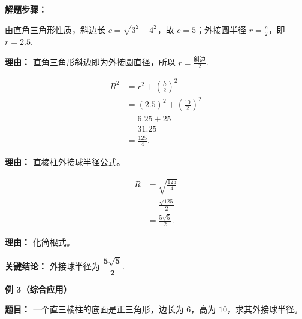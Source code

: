 \begin{examplebox}
	\textbf{\textcolor{CExample}{解题步骤：}}
	\begin{description}[style=nextline, leftmargin=2.8em, labelsep=0.5em, itemsep=0.45em]
		\item[\textbf{第一步（求底面外接圆半径）：}] 由直角三角形性质，斜边长 $c = \sqrt{3^2+4^2}$，故 $c=5$；外接圆半径 $r = \frac{c}{2}$，即 $r = 2.5$.
			\par\textbf{理由：} 直角三角形斜边即为外接圆直径，所以 $r = \frac{\text{斜边}}{2}$.
		\item[\textbf{第二步（套用公式）：}]
			\[
				\begin{aligned}
					R^2 &= r^2 + \left(\frac{h}{2}\right)^2 \\
					&= (2.5)^2 + \left(\frac{10}{2}\right)^2 \\
					&= 6.25 + 25 \\
					&= 31.25 \\
					&= \frac{125}{4}.
			\end{aligned}
			\]
			\par\textbf{理由：} 直棱柱外接球半径公式。
		\item[\textbf{第三步（求半径）：}]
			\[
				\begin{aligned}
					R &= \sqrt{\frac{125}{4}} \\
					&= \frac{\sqrt{125}}{2} \\
					&= \frac{5\sqrt{5}}{2}.
			\end{aligned}
			\]
			\par\textbf{理由：} 化简根式。
	\end{description}

	\textbf{\textcolor{CExample}{关键结论：}}
	外接球半径为 $\mathbf{\dfrac{5\sqrt{5}}{2}}$.

	\medskip
	\textbf{\textcolor{CExample}{例 3（综合应用）}}

	\textbf{\textcolor{CExample}{题目：}}
	一个直三棱柱的底面是正三角形，边长为 $6$，高为 $10$，求其外接球半径。


\end{examplebox}
